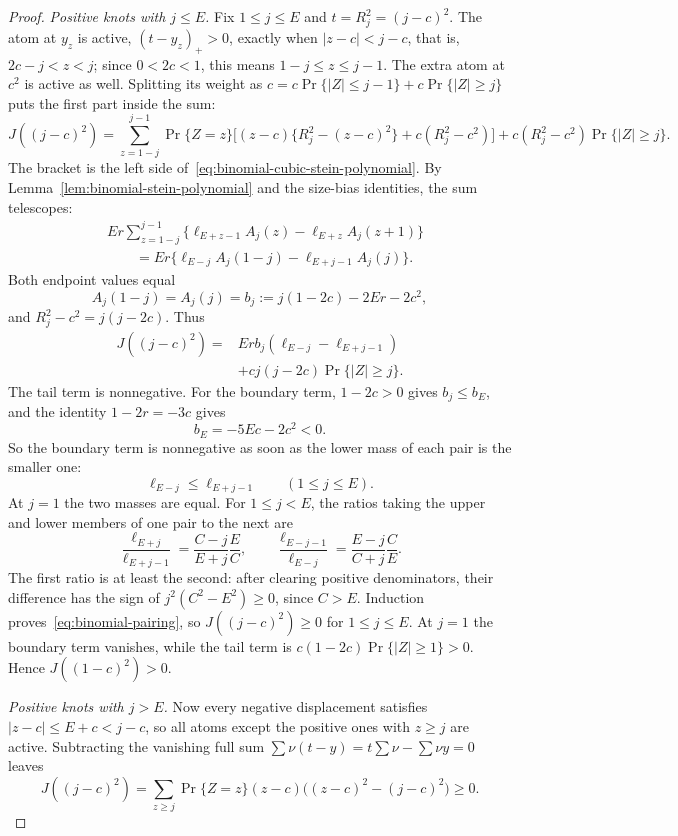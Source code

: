 \documentclass[11pt]{article}
\theoremstyle{remark}
\begin{document}
\begin{proof}
\emph{Positive knots with $j\leq E$.} Fix $1\leq j\leq E$ and
$t=R_j^2=(j-c)^2$. The atom at $y_z$ is active, $(t-y_z)_+>0$, exactly when
$|z-c|<j-c$, that is, $2c-j<z<j$; since $0<2c<1$, this means
$1-j\leq z\leq j-1$. The extra atom at $c^2$ is active as well. Splitting its
weight as $c=c\Pr\{|Z|\leq j-1\}+c\Pr\{|Z|\geq j\}$ puts the first part inside
the sum:
\[
 J((j-c)^2)=\sum_{z=1-j}^{j-1}\Pr\{Z=z\}
 \bigl[(z-c)\{R_j^2-(z-c)^2\}+c(R_j^2-c^2)\bigr]
 +c(R_j^2-c^2)\Pr\{|Z|\geq j\}.
\]
The bracket is the left side of~\eqref{eq:binomial-cubic-stein-polynomial}.
By Lemma~\ref{lem:binomial-stein-polynomial} and the size-bias identities,
the sum telescopes:
\begin{align*}
 &Er\sum_{z=1-j}^{j-1}
 \{\ell_{E+z-1}A_j(z)-\ell_{E+z}A_j(z+1)\}\\
 &\hspace{2em}=Er\{\ell_{E-j}A_j(1-j)-\ell_{E+j-1}A_j(j)\}.
\end{align*}
Both endpoint values equal
\[
 A_j(1-j)=A_j(j)=b_j:=j(1-2c)-2Er-2c^2,
\]
and $R_j^2-c^2=j(j-2c)$. Thus
\begin{equation}\label{eq:binomial-positive-knot}
 \begin{split}
 J((j-c)^2)={}&Er b_j(\ell_{E-j}-\ell_{E+j-1})\\
              &+cj(j-2c)\Pr\{|Z|\geq j\}.
 \end{split}
\end{equation}
The tail term is nonnegative. For the boundary term, $1-2c>0$ gives
$b_j\leq b_E$, and the identity $1-2r=-3c$ gives
\[
 b_E=-5Ec-2c^2<0.
\]
So the boundary term is nonnegative as soon as the lower mass of each pair
is the smaller one:
\begin{equation}\label{eq:binomial-pairing}
 \ell_{E-j}\leq\ell_{E+j-1}\qquad(1\leq j\leq E).
\end{equation}
At $j=1$ the two masses are equal. For $1\leq j<E$, the ratios taking the
upper and lower members of one pair to the next are
\[
 \frac{\ell_{E+j}}{\ell_{E+j-1}}
 =\frac{C-j}{E+j}\frac EC,\qquad
 \frac{\ell_{E-j-1}}{\ell_{E-j}}
 =\frac{E-j}{C+j}\frac CE.
\]
The first ratio is at least the second: after clearing positive
denominators, their difference has the sign of $j^2(C^2-E^2)\geq0$, since
$C>E$. Induction proves~\eqref{eq:binomial-pairing}, so
$J((j-c)^2)\geq0$ for $1\leq j\leq E$. At $j=1$ the boundary term vanishes,
while the tail term is $c(1-2c)\Pr\{|Z|\geq1\}>0$. Hence $J((1-c)^2)>0$.

\emph{Positive knots with $j>E$.} Now every negative displacement satisfies
$|z-c|\leq E+c<j-c$, so all atoms except the positive ones with $z\geq j$ are
active. Subtracting the vanishing full sum
$\sum\nu(t-y)=t\sum\nu-\sum\nu y=0$ leaves
\[
 J((j-c)^2)=\sum_{z\geq j}\Pr\{Z=z\}(z-c)
             \bigl((z-c)^2-(j-c)^2\bigr)\geq0.
\]


\end{proof}
\end{document}
